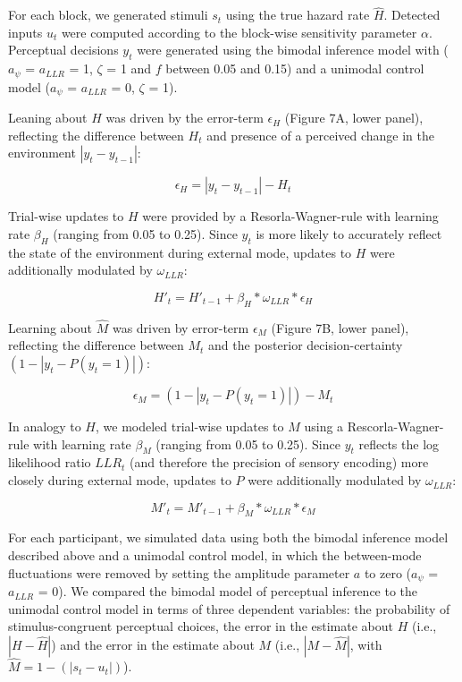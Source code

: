 \documentclass[
]{article}
\begin{document}
For each block, we generated stimuli \(s_t\) using the true hazard rate
\(\hat{H}\). Detected inputs \(u_t\) were computed according to the
block-wise sensitivity parameter \(\alpha\). Perceptual decisions
\(y_t\) were generated using the bimodal inference model with
(\(a_{\psi}\) = \(a_{LLR}\) = 1, \(\zeta\) = 1 and \(f\) between 0.05
and 0.15) and a unimodal control model (\(a_{\psi}\) = \(a_{LLR}\) = 0,
\(\zeta\) = 1).

Leaning about \(H\) was driven by the error-term \(\epsilon_H\) (Figure
7A, lower panel), reflecting the difference between \(H_t\) and presence
of a perceived change in the environment \(|y_t - y_{t-1}|\):

\begin{equation}
\epsilon_H = |y_t - y_{t-1}| - H_t
\end{equation}

Trial-wise updates to \(H\) were provided by a Resorla-Wagner-rule with
learning rate \(\beta_H\) (ranging from 0.05 to 0.25). Since \(y_t\) is
more likely to accurately reflect the state of the environment during
external mode, updates to \(H\) were additionally modulated by
\(\omega_{LLR}\):

\begin{equation}
H'_t = H'_{t-1} + \beta_H *\omega_{LLR} * \epsilon_H
\end{equation}

Learning about \(\hat{M}\) was driven by error-term \(\epsilon_M\)
(Figure 7B, lower panel), reflecting the difference between \(M_t\) and
the posterior decision-certainty \((1-|y_t - P(y_t = 1)|)\):

\begin{equation}
\epsilon_M = (1-|y_t - P(y_t = 1)|) - M_t
\end{equation}

In analogy to \(H\), we modeled trial-wise updates to \(M\) using a
Rescorla-Wagner-rule with learning rate \(\beta_M\) (ranging from 0.05
to 0.25). Since \(y_t\) reflects the log likelihood ratio \(LLR_t\) (and
therefore the precision of sensory encoding) more closely during
external mode, updates to \(P\) were additionally modulated by
\(\omega_{LLR}\):

\begin{equation}
M'_t = M'_{t-1} + \beta_M *\omega_{LLR} * \epsilon_M
\end{equation}

For each participant, we simulated data using both the bimodal inference
model described above and a unimodal control model, in which the
between-mode fluctuations were removed by setting the amplitude
parameter \(a\) to zero (\(a_{\psi}\) = \(a_{LLR}\) = 0). We compared
the bimodal model of perceptual inference to the unimodal control model
in terms of three dependent variables: the probability of
stimulus-congruent perceptual choices, the error in the estimate about
\(H\) (i.e., \(|H - \hat{H}|\)) and the error in the estimate about
\(M\) (i.e., \(|M - \hat{M}|\), with \(\hat{M} = 1- (|s_t-u_t|)\)).
\end{document}
